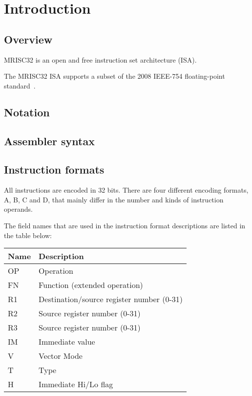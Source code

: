 %

\chapter{Introduction}

\section{Overview}

MRISC32 is an open and free instruction set architecture (ISA).

The MRISC32 ISA supports a subset of the 2008 IEEE-754 floating-point
standard~\cite{ieee754-2008}.

\section{Notation}

\tbd

\section{Assembler syntax}

\tbd

\section{Instruction formats}

All instructions are encoded in 32 bits. There are four different encoding
formats, A, B, C and D, that mainly differ in the number and kinds of
instruction operands.

The field names that are used in the instruction format descriptions are listed
in the table below:

\begin{tabular}{|l|l|}
  \hline
  \textbf{Name} & \textbf{Description} \\
  \hline
  OP & Operation \\
  \hline
  FN & Function (extended operation) \\
  \hline
  R1 & Destination/source register number (0-31) \\
  \hline
  R2 & Source register number (0-31) \\
  \hline
  R3 & Source register number (0-31) \\
  \hline
  IM & Immediate value \\
  \hline
  V  & Vector Mode \\
  \hline
  T  & Type \\
  \hline
  H  & Immediate Hi/Lo flag \\
  \hline
\end{tabular}

